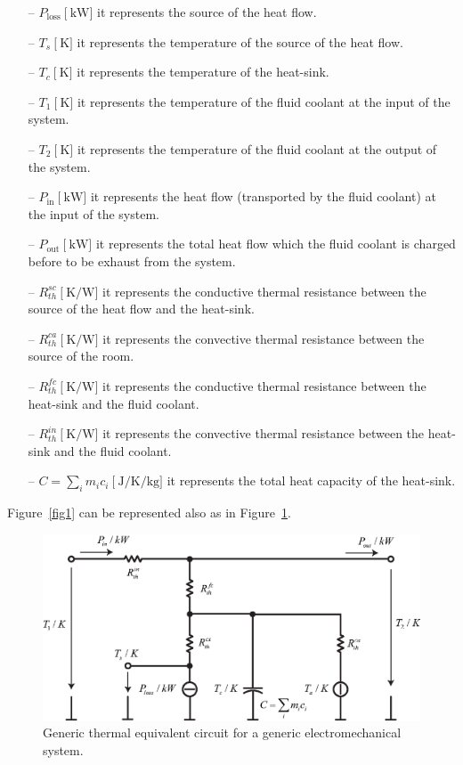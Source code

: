 \documentclass[11pt,a4paper,oneside]{book}
\numberwithin{equation}{section}
\theoremstyle{it}
\theoremstyle{definition}
\begin{document}
\begin{itemize}
	\item[--] $P_\text{loss}\ \Big[\SI{}{\kilo\watt}\Big]$ it represents the source of the heat flow.	
	\item[--] $T_s\ \Big[\SI{}{\kelvin}\Big]$ it represents the temperature of the source of the heat flow.	\item[--] $T_c\ \Big[\SI{}{\kelvin}\Big]$ it represents the temperature of the heat-sink.
	\item[--] $T_1\ \Big[\SI{}{\kelvin}\Big]$ it represents the temperature of the fluid coolant at the input of the system.
	\item[--] $T_2\ \Big[\SI{}{\kelvin}\Big]$ it represents the temperature of the fluid coolant at the output of the system.
	\item[--] $P_\text{in}\ \Big[\SI{}{\kilo\watt}\Big]$ it represents the heat flow (transported by the fluid coolant) at the input of the system.	
	\item[--] $P_\text{out}\ \Big[\SI{}{\kilo\watt}\Big]$ it represents the total heat flow which the fluid coolant is charged before to be exhaust from the system.
	\item[--] $R_{th}^{sc}\ \Big[\SI{}{\kelvin\per\watt}\Big]$ it represents the conductive thermal resistance between the source of the heat flow and the heat-sink.
	\item[--] $R_{th}^{ca}\ \Big[\SI{}{\kelvin\per\watt}\Big]$ it represents the convective thermal resistance between the source of the room.	
	\item[--] $R_{th}^{fc}\ \Big[\SI{}{\kelvin\per\watt}\Big]$ it represents the conductive thermal resistance between the heat-sink and the fluid coolant.	
	\item[--] $R_{th}^{in}\ \Big[\SI{}{\kelvin\per\watt}\Big]$ it represents the convective thermal resistance between the heat-sink and the fluid coolant.
	\item[--] $C=\sum_{i}m_ic_i\ \Big[\SI{}{\joule\per\kelvin\per\kilogram}\Big]$ it represents the total heat capacity of the heat-sink.
\end{itemize}
Figure~\ref{fig1} can be represented also as in Figure~\ref{fig2}.
\begin{figure}[H]
	\centering
	\includegraphics[width = 400pt, angle = 0, keepaspectratio]{figures/generic_thermal_model/generic_thermal_model_3.eps}
	\captionsetup{width=0.5\textwidth, font=small}	
	\caption{Generic thermal equivalent circuit for a generic electromechanical system.}
	\label{fig2}
\end{figure}
\end{document}
